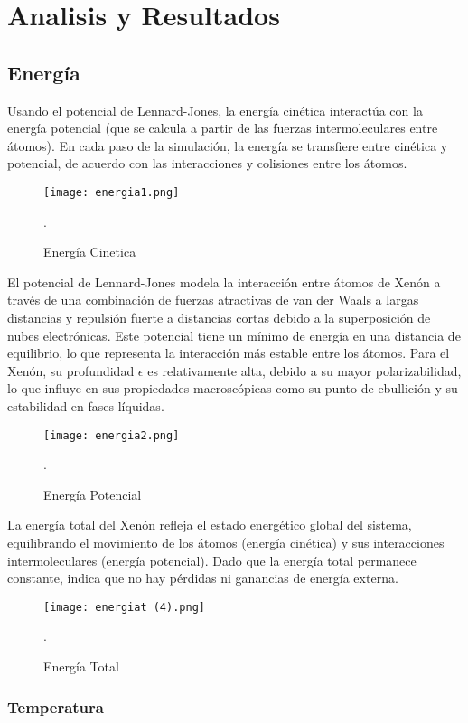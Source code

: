 \documentclass[10pt,letterpaper,twocolumn]{article}
\begin{document}
\section*{Analisis y Resultados}

\subsection*{Energía}

Usando el potencial de Lennard-Jones, la energía cinética interactúa con la energía 
potencial (que se calcula a partir de las fuerzas intermoleculares entre átomos).
 En cada paso de la simulación, la energía se transfiere entre cinética y potencial,
  de acuerdo con las interacciones y colisiones entre los átomos.

\begin{figure}[h]
	\centering
	\texttt{[image: energia1.png]}
	\caption{Energía Cinetica}.
\end{figure}

El potencial de Lennard-Jones modela la interacción entre átomos de Xenón a
través de una combinación de fuerzas atractivas de van der Waals a largas
distancias y repulsión fuerte a distancias cortas debido a la superposición
de nubes electrónicas. Este potencial tiene un mínimo de energía en una distancia 
de equilibrio, lo que representa la interacción más estable entre los átomos. Para 
el Xenón, su profundidad $\epsilon$ es relativamente alta, debido a su mayor 
polarizabilidad, lo que influye en sus propiedades macroscópicas como su punto 
de ebullición y su estabilidad en fases líquidas.

\begin{figure}[h]
	\centering
	\texttt{[image: energia2.png]}
	\caption{Energía Potencial}.
\end{figure}

La energía total del Xenón refleja el estado energético global del sistema, equilibrando 
el movimiento de los átomos (energía cinética) y sus interacciones intermoleculares 
(energía potencial). Dado que la energía total permanece constante, indica que no hay pérdidas 
ni ganancias de energía externa.

\begin{figure}[h]
	\centering
	\texttt{[image: energiat (4).png]}
	\caption{Energía Total}.
\end{figure}

\subsubsection*{Temperatura}
\end{document}
